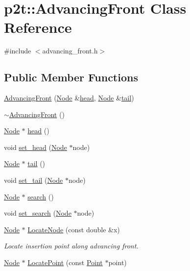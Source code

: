 \hypertarget{classp2t_1_1_advancing_front}{}\section{p2t\+:\+:Advancing\+Front Class Reference}
\label{classp2t_1_1_advancing_front}


{\ttfamily \#include $<$advancing\+\_\+front.\+h$>$}

\subsection*{Public Member Functions}
\begin{DoxyCompactItemize}
\item 
\hyperlink{classp2t_1_1_advancing_front_aaea788406dc0ede87ab08901b64e6a62}{Advancing\+Front} (\hyperlink{structp2t_1_1_node}{Node} \&\hyperlink{classp2t_1_1_advancing_front_a1aaf09a3d1fd17743549de1a77965883}{head}, \hyperlink{structp2t_1_1_node}{Node} \&\hyperlink{classp2t_1_1_advancing_front_a61de74fbeeb93ff0481de377d5072370}{tail})
\item 
\hyperlink{classp2t_1_1_advancing_front_af53ed6954cd092720e4ced814d560705}{$\sim$\+Advancing\+Front} ()
\item 
\hyperlink{structp2t_1_1_node}{Node} $\ast$ \hyperlink{classp2t_1_1_advancing_front_a1aaf09a3d1fd17743549de1a77965883}{head} ()
\item 
void \hyperlink{classp2t_1_1_advancing_front_a07f4df2b993ec6fba32491d87d76aefe}{set\+\_\+head} (\hyperlink{structp2t_1_1_node}{Node} $\ast$node)
\item 
\hyperlink{structp2t_1_1_node}{Node} $\ast$ \hyperlink{classp2t_1_1_advancing_front_a61de74fbeeb93ff0481de377d5072370}{tail} ()
\item 
void \hyperlink{classp2t_1_1_advancing_front_a3e42d890f8871eecdbd9789d141800b8}{set\+\_\+tail} (\hyperlink{structp2t_1_1_node}{Node} $\ast$node)
\item 
\hyperlink{structp2t_1_1_node}{Node} $\ast$ \hyperlink{classp2t_1_1_advancing_front_a77046a96ab291e136dfd3072b74b88b5}{search} ()
\item 
void \hyperlink{classp2t_1_1_advancing_front_a27bbf888fd7c036db00347278591c2c4}{set\+\_\+search} (\hyperlink{structp2t_1_1_node}{Node} $\ast$node)
\item 
\hyperlink{structp2t_1_1_node}{Node} $\ast$ \hyperlink{classp2t_1_1_advancing_front_a2fd35c4f0f200b5ead2e7f810837b135}{Locate\+Node} (const double \&x)
\begin{DoxyCompactList}\small\item\em Locate insertion point along advancing front. \end{DoxyCompactList}\item 
\hyperlink{structp2t_1_1_node}{Node} $\ast$ \hyperlink{classp2t_1_1_advancing_front_afbdb7f0670b0fa5b2733ac8aded17dfc}{Locate\+Point} (const \hyperlink{structp2t_1_1_point}{Point} $\ast$point)
\end{DoxyCompactItemize}


